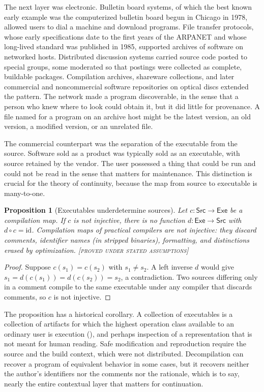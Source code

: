 \documentclass[11pt,twoside,openright]{book}
\theoremstyle{plain}
\newtheorem{proposition}[theorem]{Proposition}
\theoremstyle{definition}
\theoremstyle{remark}
\newcommand{\Proved}{\textup{\textsc{[proved under stated assumptions]}}}
\begin{document}
The next layer was electronic. Bulletin board systems, of which the best known early example was the computerized bulletin board begun in Chicago in 1978, allowed users to dial a machine and download programs. File transfer protocols, whose early specifications date to the first years of the ARPANET and whose long-lived standard was published in 1985, supported archives of software on networked hosts. Distributed discussion systems carried source code posted to special groups, some moderated so that postings were collected as complete, buildable packages. Compilation archives, shareware collections, and later commercial and noncommercial software repositories on optical discs extended the pattern. The network made a program discoverable, in the sense that a person who knew where to look could obtain it, but it did little for provenance. A file named for a program on an archive host might be the latest version, an old version, a modified version, or an unrelated file.

The commercial counterpart was the separation of the executable from the source. Software sold as a product was typically sold as an executable, with source retained by the vendor. The user possessed a thing that could be run and could not be read in the sense that matters for maintenance. This distinction is crucial for the theory of continuity, because the map from source to executable is many-to-one.

\begin{proposition}[Executables underdetermine sources]\label{prop:compile}
Let $c:\mathsf{Src}\to\mathsf{Exe}$ be a compilation map. If $c$ is not injective, there is no function $d:\mathsf{Exe}\to\mathsf{Src}$ with $d\circ c=\mathrm{id}$. Compilation maps of practical compilers are not injective: they discard comments, identifier names (in stripped binaries), formatting, and distinctions erased by optimization.
\Proved{}
\end{proposition}

\begin{proof}
Suppose $c(s_1)=c(s_2)$ with $s_1\ne s_2$. A left inverse $d$ would give $s_1=d(c(s_1))=d(c(s_2))=s_2$, a contradiction. Two sources differing only in a comment compile to the same executable under any compiler that discards comments, so $c$ is not injective.
\end{proof}

The proposition has a historical corollary. A collection of executables is a collection of artifacts for which the highest operation class available to an ordinary user is execution (), and perhaps inspection of a representation that is not meant for human reading. Safe modification and reproduction require the source and the build context, which were not distributed. Decompilation can recover a program of equivalent behavior in some cases, but it recovers neither the author's identifiers nor the comments nor the rationale, which is to say, nearly the entire contextual layer that matters for continuation.
\end{document}
